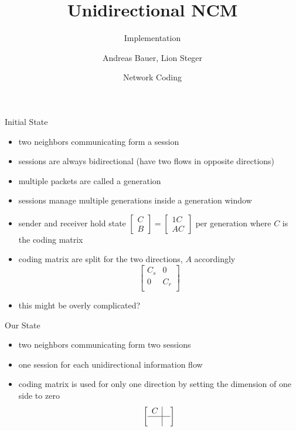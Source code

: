 \documentclass[11pt]{beamer}
\title[Short version]{Unidirectional NCM}
\subtitle[short version]{Implementation}
\date[2021]{Network Coding}
\author[Andreas Bauer, Lion Steger]{Andreas Bauer, Lion Steger}
\institute[Technische Universität München]{Technische Universität München}
\begin{document}
	\frame{\maketitle}
	
	\begin{frame}{Initial State}
		\begin{itemize}
			\item two neighbors communicating form a session
			\item sessions are always bidirectional (have two flows in opposite directions)
			\item multiple packets are called a generation
			\item sessions manage multiple generations inside a generation window
			\item sender and receiver hold state $ \begin{bmatrix}
				C \\ B
			\end{bmatrix} = \begin{bmatrix}
				1 C \\ A C
			\end{bmatrix} $ per generation where $ C $ is the coding matrix
			\item coding matrix are split for the two directions, $A$ accordingly
			\[
			\left[
			\begin{array}{c|c}
			C_s & 0 \\ \hline
			0 & C_r \\
			\end{array}
			\right]
			\]
			\item this might be overly complicated?
		\end{itemize}
	\end{frame}

	\begin{frame}{Our State}
		\begin{itemize}
			\item two neighbors communicating form two sessions
			\item one session for each unidirectional information flow
			\item coding matrix is used for only one direction by setting the dimension of one side to zero
			\[
			\left[
			\begin{array}{c|c}
			C &  \\ \hline
			  &  \\
			\end{array}
			\right]
			\]
		\end{itemize}
	\end{frame}
\end{document}
